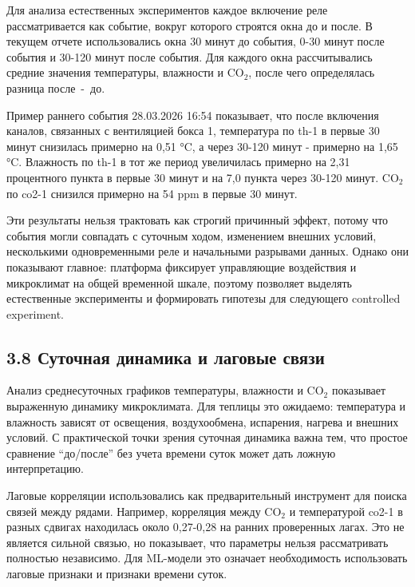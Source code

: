 \documentclass[a4paper,14pt]{extarticle}
\renewcommand{\texttt}[1]{\textnormal{#1}}
\begin{document}
Для анализа естественных экспериментов каждое включение реле
рассматривается как событие, вокруг которого строятся окна до и после. В
текущем отчете использовались окна 30 минут до события, 0-30 минут после
события и 30-120 минут после события. Для каждого окна рассчитывались
средние значения температуры, влажности и CO\(_2\), после чего
определялась разница \texttt{после\ -\ до}.

Пример раннего события 28.03.2026 16:54 показывает, что после включения
каналов, связанных с вентиляцией бокса 1, температура по \texttt{th-1} в
первые 30 минут снизилась примерно на 0,51 °C, а через 30-120 минут -
примерно на 1,65 °C. Влажность по \texttt{th-1} в тот же период
увеличилась примерно на 2,31 процентного пункта в первые 30 минут и на
7,0 пункта через 30-120 минут. CO\(_2\) по \texttt{co2-1} снизился
примерно на 54 ppm в первые 30 минут.

Эти результаты нельзя трактовать как строгий причинный эффект, потому
что события могли совпадать с суточным ходом, изменением внешних
условий, несколькими одновременными реле и начальными разрывами данных.
Однако они показывают главное: платформа фиксирует управляющие
воздействия и микроклимат на общей временной шкале, поэтому позволяет
выделять естественные эксперименты и формировать гипотезы для следующего
controlled experiment.

\subsection{3.8 Суточная динамика и лаговые
связи}\label{ux441ux443ux442ux43eux447ux43dux430ux44f-ux434ux438ux43dux430ux43cux438ux43aux430-ux438-ux43bux430ux433ux43eux432ux44bux435-ux441ux432ux44fux437ux438}

Анализ среднесуточных графиков температуры, влажности и CO\(_2\)
показывает выраженную динамику микроклимата. Для теплицы это ожидаемо:
температура и влажность зависят от освещения, воздухообмена, испарения,
нагрева и внешних условий. С практической точки зрения суточная динамика
важна тем, что простое сравнение ``до/после'' без учета времени суток
может дать ложную интерпретацию.

Лаговые корреляции использовались как предварительный инструмент для
поиска связей между рядами. Например, корреляция между CO\(_2\) и
температурой \texttt{co2-1} в разных сдвигах находилась около 0,27-0,28
на ранних проверенных лагах. Это не является сильной связью, но
показывает, что параметры нельзя рассматривать полностью независимо. Для
ML-модели это означает необходимость использовать лаговые признаки и
признаки времени суток.
\end{document}
